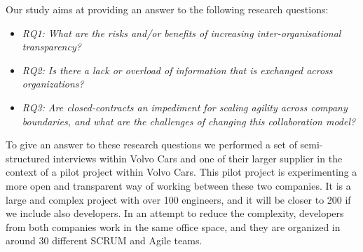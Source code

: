 Our study aims at providing an answer to the following research questions:

%

\begin{itemize}
\item {\em RQ1: What are the risks and/or benefits of increasing inter-organisational transparency?}
\item {\em RQ2: Is there a lack or overload of information that is exchanged across organizations?} 
\item {\em RQ3: Are closed-contracts an impediment for scaling agility across company boundaries, and what are the challenges of changing this collaboration model?} %
\end{itemize}

To give an answer to these research questions we performed a set of semi-structured interviews within Volvo Cars and 
one of their larger supplier in the context of a pilot project within Volvo Cars. This pilot project is experimenting a more open and transparent way of working between these two companies. It is a large and complex project with over 100 engineers, and it will be closer to 200 if we include also developers. %
In an attempt to reduce the complexity, developers from both companies work in the same office space, and they are organized in around 30 different SCRUM and Agile teams.

